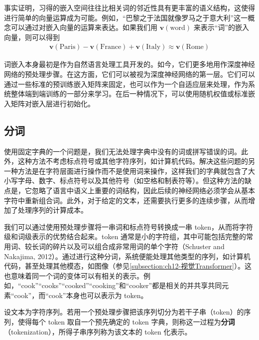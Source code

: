 \documentclass[../../main.tex]{subfiles}
\begin{document}
事实证明，习得的嵌入空间往往比相关词的邻近性具有更丰富的语义结构，这使得进行简单的向量运算成为可能。例如，“巴黎之于法国就像罗马之于意大利”这一概念可以通过对嵌入向量的运算来表达。如果我们用 $\mathbf{v}(\mathrm{word})$ 来表示“词”的嵌入向量，则可以得到
\begin{align}
\mathbf{v}(\mathrm{Paris})-\mathbf{v}(\mathrm{France})+\mathbf{v}(\mathrm{Italy})\approx\mathbf{v}(\mathrm{Rome})
\label{align:ch12-词嵌入类比}
\end{align}

词嵌入本身最初是作为自然语言处理工具开发的。如今，它们更多地用作深度神经网络的预处理步骤。在这方面，它们可以被视为深度神经网络的第一层。它们可以通过一些标准的预训练嵌入矩阵来固定，也可以作为一个自适应层来处理，作为系统整体端到端训练的一部分来学习。在后一种情况下，可以使用随机权值或标准嵌入矩阵对嵌入层进行初始化。

\subsection{分词}\label{subsection:ch12-分词}

使用固定字典的一个问题是，我们无法处理字典中没有的词或拼写错误的词。此外，这种方法不考虑标点符号或其他字符序列，如计算机代码。解决这些问题的另一种方法是在字符层面进行操作而不是使用词来操作，这样我们的字典就包含了大小写字母、数字、标点符号以及其他符号（如空格和制表符等）。但这种方法的缺点是，它忽略了语言中语义上重要的词结构，因此后续的神经网络必须学会从基本字符中重新组合词。此外，对于给定的文本，还需要执行更多的连续步骤，从而增加了处理序列的计算成本。

我们可以通过使用预处理步骤将一串词和标点符号转换成一串 token，从而将字符级和词级表示的优势结合起来。token 通常是小的字符组，其中可能包括完整的常用词、较长词的碎片以及可以组合成非常用词的单个字符（Schuster and Nakajima, 2012）。通过进行这种分词，系统便能处理其他类型的序列，如计算机代码，甚至处理其他模态，如图像（参见\cref{subsection:ch12-视觉Transformer}）。这也意味着同一个词的变体可以有相关的表示。例如，“cook”“cooks”“cooked”“cooking”和“cooker”都是相关的并共享共同元素“cook”，而“cook”本身也可以表示为 token。

\begin{definition}[分词]\label{definition:ch12-分词}
设文本为字符序列。若用一个预处理步骤把该序列切分为若干子串（token）的序列，使得每个 token 取自一个预先确定的 token 字典，则称这一过程为\textbf{分词}（tokenization），所得子串序列称为该文本的 token 化表示。
\end{definition}
\end{document}
